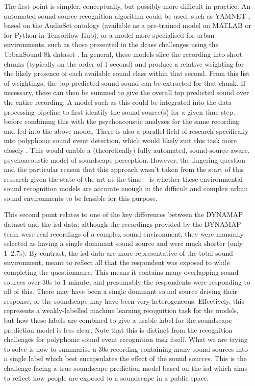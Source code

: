 The first point is simpler, conceptually, but possibly more difficult in practice. An automated sound source recognition algorithm could be used, such as YAMNET \citep{Hershey2017CNN}, based on the AudioSet ontology \citep{Gemmeke2017Audio} (available as a pre-trained model on MATLAB or for Python in Tensorflow Hub), or a model more specialised for urban environments, such as those presented in the \gls{dcase} challenges \citep{Bello2019SONYC} using the UrbanSound 8k dataset \citep{Salamon2014Dataset}. In general, these models slice the recording into short chunks (typically on the order of 1 second) and produce a relative weighting for the likely presence of each available sound class within that second. From this list of weightings, the top predicted sound sound can be extracted for that chunk. If necessary, these can then be summed to give the overall top predicted sound over the entire recording. A model such as this could be integrated into the data processing pipeline to first identify the sound source(s) for a given time step, before combining this with the psychoacoustic analyses for the same recording and fed into the above model. There is also a parallel field of research specifically into polyphonic sound event detection, which would likely suit this task more closely \citep{Mesaros2016Metrics}. This would enable a (theoretically) fully automated, sound-source aware, psychoacoustic model of soundscape perception. However, the lingering question -- and the particular reason that this approach wasn't taken from the start of this research given the state-of-the-art at the time -- is whether these environmental sound recognition models are accurate enough in the difficult and complex urban sound environments to be feasible for this purpose. 

This second point relates to one of the key differences between the DYNAMAP dataset and the \gls{isd} data; although the recordings provided by the DYNAMAP team were real recordings of a complex sound environment, they were manually selected as having a single dominant sound source and were much shorter (only 1--2.7s). By contrast, the \gls{isd} data are more representative of the total sound environment, meant to reflect all that the respondent was exposed to while completing the questionnaire. This means it contains many overlapping sound sources over 30s to 1 minute, and presumably the respondents were responding to all of this. There may have been a single dominant sound source driving their response, or the soundscape may have been very heterogeneous. Effectively, this represents a weakly-labelled machine learning recognition task for the models, but how these labels are combined to give a usable label for the soundscape prediction model is less clear. Note that this is distinct from the recognition challenges for polyphonic sound event recognition task itself. What we are trying to solve is how to summarise a 30s recording containing many sound sources into a single label which best encapsulates the effect of the sound sources. This is the challenge facing a true soundscape prediction model based on the \gls{isd} which aims to reflect how people are exposed to a soundscape in a public space. 

